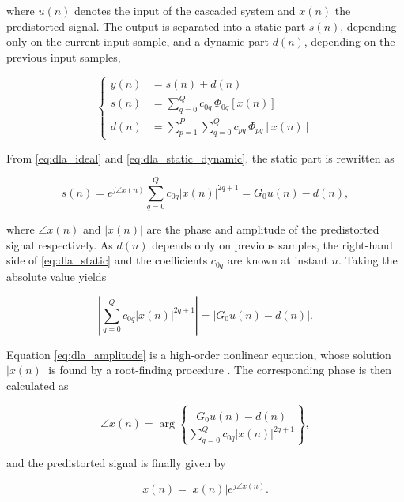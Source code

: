 where $u(n)$ denotes the input of the cascaded system and $x(n)$ the predistorted signal. The output is separated into a static part $s(n)$, depending only on the current input sample, and a dynamic part $d(n)$, depending on the previous input samples,

\begin{equation}
  \left\{
  \begin{aligned}
    y(n) &= s(n) + d(n) \\
    s(n) &= \sum_{q=0}^{Q} c_{0q}\,\Phi_{0q}\!\left[x(n)\right] \\
    d(n) &= \sum_{p=1}^{P}\sum_{q=0}^{Q} c_{pq}\,\Phi_{pq}\!\left[x(n)\right]
  \end{aligned}
  \right.
  \label{eq:dla_static_dynamic}
\end{equation}

From \eqref{eq:dla_ideal} and \eqref{eq:dla_static_dynamic}, the static part is rewritten as

\begin{equation}
  s(n) = e^{j\angle x(n)}\sum_{q=0}^{Q} c_{0q}\left|x(n)\right|^{2q+1} = G_0 u(n) - d(n),
  \label{eq:dla_static}
\end{equation}

where $\angle x(n)$ and $|x(n)|$ are the phase and amplitude of the predistorted signal respectively. As $d(n)$ depends only on previous samples, the right-hand side of \eqref{eq:dla_static} and the coefficients $c_{0q}$ are known at instant $n$. Taking the absolute value yields

\begin{equation}
  \left|\sum_{q=0}^{Q} c_{0q}\left|x(n)\right|^{2q+1}\right| = \left|G_0 u(n) - d(n)\right| .
  \label{eq:dla_amplitude}
\end{equation}

Equation \eqref{eq:dla_amplitude} is a high-order nonlinear equation, whose solution $|x(n)|$ is found by a root-finding procedure \cite{feng2016}. The corresponding phase is then calculated as

\begin{equation}
  \angle x(n) = \arg\left\{\frac{G_0 u(n) - d(n)}{\sum_{q=0}^{Q} c_{0q}\left|x(n)\right|^{2q+1}}\right\},
  \label{eq:dla_phase}
\end{equation}

and the predistorted signal is finally given by

\begin{equation}
  x(n) = \left|x(n)\right| e^{j\angle x(n)}.
  \label{eq:dla_predistorted}
\end{equation}

